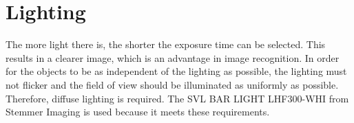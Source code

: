 \section{Lighting}
\label{sec:hardware:lighting}
The more light there is, the shorter the exposure time can be selected.
This results in a clearer image, which is an advantage in image recognition.
In order for the objects to be as independent of the lighting as possible, the lighting must not flicker and the field of view should be illuminated as uniformly as possible.
Therefore, diffuse lighting is required.
The SVL BAR LIGHT LHF300-WHI from Stemmer Imaging is used because it meets these requirements.